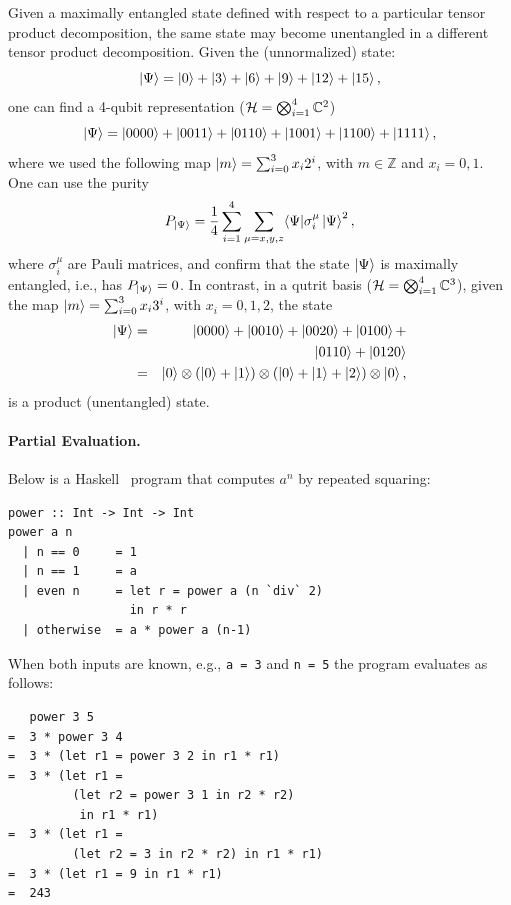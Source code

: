 \documentclass[aps,prl,twocolumn,superscriptaddress,floatfix,notitlepage]{revtex4-2}
\newcommand{\h}[1]{\texttt{#1}}
\begin{document}
Given a maximally entangled state defined with respect to a particular
tensor product decomposition, the same state may become unentangled in
a different tensor product decomposition. Given the (unnormalized) state:
\[
 \ket{\Psi} =\ket{0}+\ket{3}+\ket{6}+\ket{9}+\ket{12}+\ket{15},
\]
one can find a 4-qubit representation (${\cal H}=\bigotimes_{i=1}^4
\mathbb{C}^2$)
\[
 \ket{\Psi} = \ket{0000}+\ket{0011}+\ket{0110} 
  + \ket{1001}+\ket{1100}+\ket{1111},
\]
where we used the following map $\ket{m}=\sum_{i=0}^3 x_i 2^i$, with
$m \in \mathbb{Z}$ and $x_i=0,1$.  One can use the purity~\cite{GE2004}
\[
 P_{\ket{\Psi} }=\frac{1}{4}\sum_{i=1}^4\sum_{\mu=x,y,z}\langle \Psi |
 \sigma^\mu_i \ket{\Psi}^2 ,
\]
where $\sigma^\mu_i$ are Pauli matrices, 
and confirm that the state $\ket{\Psi}$ is maximally entangled, i.e.,
has $P_{\ket{\Psi}} =0$. In contrast, in a qutrit basis (${\cal
  H}=\bigotimes_{i=1}^4 \mathbb{C}^3$), given the map
$\ket{m}=\sum_{i=0}^3 x_i 3^i$, with $x_i=0,1,2$, the state
\begin{eqnarray}
 \ket{\Psi} &=&\ket{0000}+\ket{0010}+\ket{0020} 
  + \ket{0100}+ \nonumber \\
  && \quad\ket{0110}+\ket{0120} \nonumber \\
 &=&\ket{0}\otimes(\ket{0}+\ket{1})\otimes(\ket{0}+\ket{1}+\ket{2})\otimes\ket{0}, \nonumber
\end{eqnarray}
is a product (unentangled) state. 

\paragraph*{Partial Evaluation.}
Below is a Haskell~\cite{haskell} program that computes $a^n$ by repeated squaring:
\begin{verbatim}
power :: Int -> Int -> Int
power a n
  | n == 0     = 1
  | n == 1     = a
  | even n     = let r = power a (n `div` 2) 
                 in r * r 
  | otherwise  = a * power a (n-1)
\end{verbatim}
When both inputs are known, e.g., \h{a = 3} and \h{n = 5}  the
program evaluates as follows:
\begin{verbatim}
   power 3 5
=  3 * power 3 4
=  3 * (let r1 = power 3 2 in r1 * r1)
=  3 * (let r1 = 
         (let r2 = power 3 1 in r2 * r2) 
          in r1 * r1)
=  3 * (let r1 = 
         (let r2 = 3 in r2 * r2) in r1 * r1)
=  3 * (let r1 = 9 in r1 * r1)
=  243
\end{verbatim}
\end{document}
